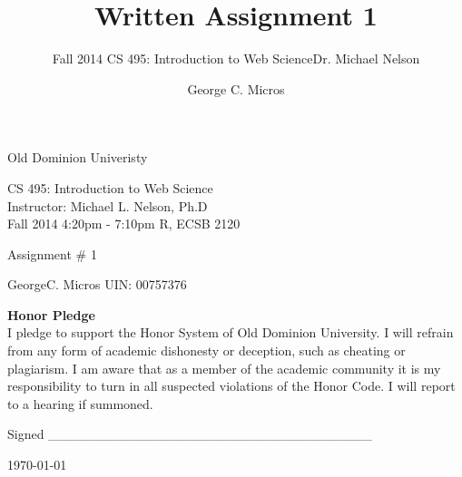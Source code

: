 \documentclass[]{svmono}
\begin{document}
\begin{titlepage}    
\begin{center}
\vspace*{0in}
\huge{\sc  Old Dominion Univeristy\\  }



\vspace{1in}
\Large{\sc CS 495: Introduction to Web Science \\ Instructor: Michael L. Nelson, Ph.D \\ Fall 2014 4:20pm - 7:10pm R, ECSB 2120\\}

\vspace{1in}
\Large{Assignment \# 1\\}

\vspace{.5cm}
\Large{ \sc GeorgeC.  Micros  UIN: 00757376\\ }



\vspace {7cm}

{\large \bf {Honor Pledge}}\\
{I pledge to support the Honor System of Old Dominion University. I will refrain from any form of academic dishonesty or deception, such as cheating or plagiarism. I am aware that as a member of the academic community it is my responsibility to turn in all suspected violations of the Honor Code. I will report to a hearing if summoned. }\\
\vspace {.5cm}

{Signed \_\_\_\_\_\_\_\_\_\_\_\_\_\_\_\_\_\_\_\_\_\_\_\_\_\_\_\_\_\_\_\_\_\_}


\today
\end{center}
\end{titlepage}



\author{George C. Micros}
\title{Written Assignment 1}
\subtitle{Fall 2014 \newline  CS 495: Introduction to Web Science\newline Dr. Michael Nelson}
\maketitle


\tableofcontents
\end{document}
